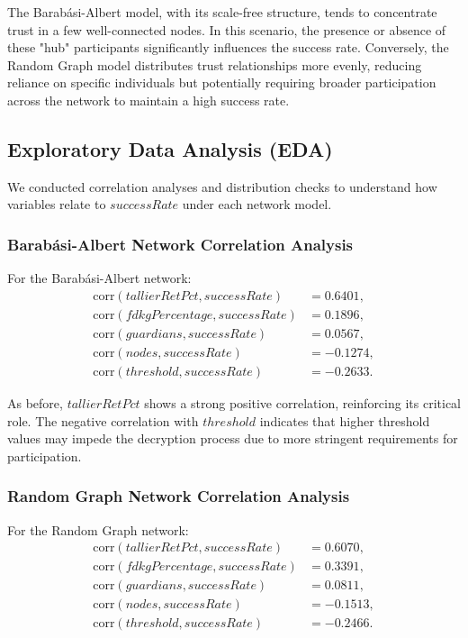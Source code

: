 \documentclass[runningheads]{llncs}
\begin{document}
The Barabási-Albert model, with its scale-free structure, tends to concentrate trust in a few well-connected nodes. In this scenario, the presence or absence of these "hub" participants significantly influences the success rate. Conversely, the Random Graph model distributes trust relationships more evenly, reducing reliance on specific individuals but potentially requiring broader participation across the network to maintain a high success rate.

\subsection{Exploratory Data Analysis (EDA)}

We conducted correlation analyses and distribution checks to understand how variables relate to $successRate$ under each network model.

\subsubsection{Barabási-Albert Network Correlation Analysis}

For the Barabási-Albert network:
\[
\begin{aligned}
\text{corr}(tallierRetPct, successRate) &= 0.6401, \\
\text{corr}(fdkgPercentage, successRate) &= 0.1896, \\
\text{corr}(guardians, successRate) &= 0.0567, \\
\text{corr}(nodes, successRate) &= -0.1274, \\
\text{corr}(threshold, successRate) &= -0.2633.
\end{aligned}
\]

As before, $tallierRetPct$ shows a strong positive correlation, reinforcing its critical role. The negative correlation with $threshold$ indicates that higher threshold values may impede the decryption process due to more stringent requirements for participation.

\subsubsection{Random Graph Network Correlation Analysis}

For the Random Graph network:
\[
\begin{aligned}
\text{corr}(tallierRetPct, successRate) &= 0.6070, \\
\text{corr}(fdkgPercentage, successRate) &= 0.3391, \\
\text{corr}(guardians, successRate) &= 0.0811, \\
\text{corr}(nodes, successRate) &= -0.1513, \\
\text{corr}(threshold, successRate) &= -0.2466.
\end{aligned}
\]
\end{document}
